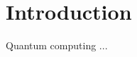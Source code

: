 \documentclass[conference]{IEEEtran}
\begin{document}

\section{Introduction}

    Quantum computing ...
    



    






% 
% 




\end{document}
